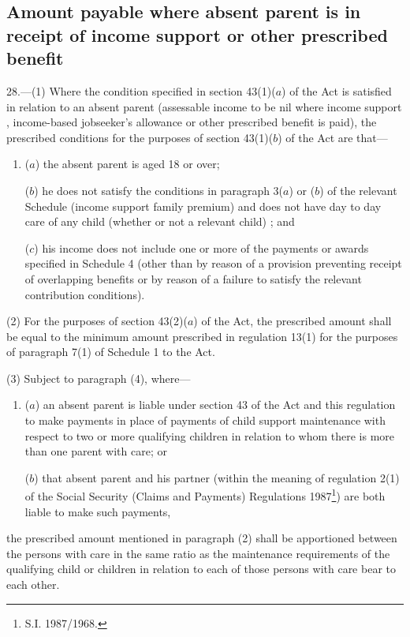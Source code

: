 \documentclass[12pt,a4paper]{article}
\begin{document}

\subsection[28. Amount payable where absent parent is in receipt of income support or other prescribed benefit]{Amount payable where absent parent is in receipt of income support or other prescribed benefit}

28.—(1) Where the condition specified in section 43(1)($a$) of the Act is satisfied in relation to an absent parent (assessable income to be nil where income support%
, income-based jobseeker’s allowance  %
 or other prescribed benefit is paid), the prescribed conditions for the purposes of section 43(1)($b$) of the Act are that—
\begin{enumerate}\item[]
($a$) the absent parent is aged 18 or over;

($b$) he does not satisfy the conditions in paragraph 
3($a$) or ($b$)  %
of the relevant Schedule (income support family premium)
and does not have day to day care of any child (whether or not a relevant child)%
; and

($c$) 
his income does not include %
one or more of the payments or awards specified in Schedule 4 (other than by reason of a provision preventing receipt of overlapping benefits or by reason of a failure to satisfy the relevant contribution conditions).
\end{enumerate}

(2) For the purposes of section 43(2)($a$) of the Act, the prescribed amount shall be equal to the minimum amount prescribed in regulation 13(1) for the purposes of paragraph 7(1) of Schedule 1 to the Act.

(3) Subject to paragraph (4), where—
\begin{enumerate}\item[]
($a$) an absent parent is liable under section 43 of the Act and this regulation to make payments in place of payments of child support maintenance with respect to two or more qualifying children in relation to whom there is more than one parent with care; or

($b$) that absent parent and his partner (within the meaning of regulation 2(1) of the Social Security (Claims and Payments) Regulations 1987\footnote{\frenchspacing S.I. 1987/1968.}) are both liable to make such payments,
\end{enumerate}
the prescribed amount mentioned in paragraph (2) shall be apportioned between the persons with care in the same ratio as the maintenance requirements of the qualifying child or children in relation to each of those persons with care bear to each other.
\end{document}
